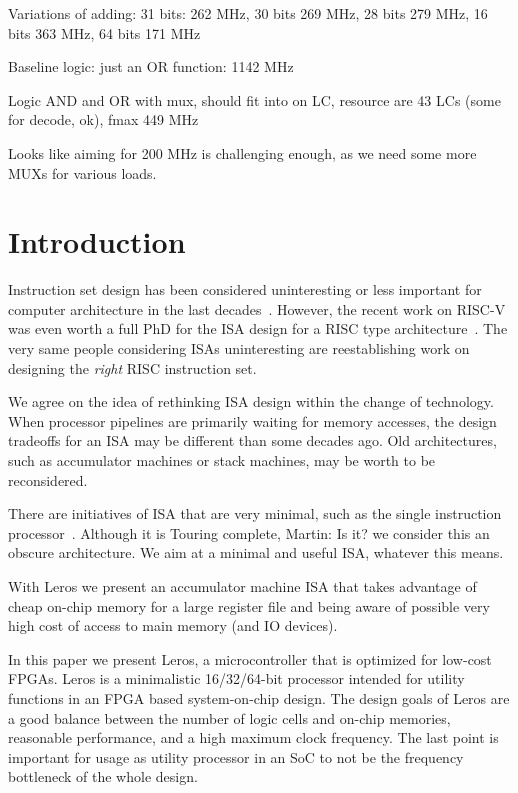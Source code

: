 \documentclass[a4paper,fontsize=10pt,twoside,DIV15,BCOR12mm,headinclude=true,footinclude=false,pagesize,bibtotoc]{scrbook}
\newcommand{\martin}[1]{{\color{blue} Martin: #1}}
\begin{document}
Variations of adding: 31 bits: 262 MHz, 30 bits 269 MHz, 28 bits 279 MHz, 16 bits 363 MHz, 64 bits 171 MHz

Baseline logic: just an OR function: 1142 MHz

Logic AND and OR with mux, should fit into on LC, resource are 43 LCs (some for decode, ok), fmax 449 MHz

Looks like aiming for 200 MHz is challenging enough, as we need some more MUXs
for various loads.



\chapter{Introduction}
\label{sec:intro}

Instruction set design has been considered uninteresting or less important for computer
architecture in the last decades~\cite{the right H and P book, or the slides}.
However, the recent work on RISC-V was even worth a full PhD for the ISA design
for a RISC type architecture~\cite{Andrew thesis}.
The very same people considering ISAs uninteresting are reestablishing work on
designing the \emph{right} RISC instruction set.

We agree on the idea of rethinking ISA design within the change of technology.
When processor pipelines are primarily waiting for memory accesses, the design
tradeoffs for an ISA may be different than some decades ago.
Old architectures, such as accumulator machines or stack machines, may be worth
to be reconsidered.

There are initiatives of ISA that are very minimal, such as the single instruction
processor~\cite{find it}. Although it is Touring complete, \martin{Is it?} we consider this
an obscure architecture.
We aim at a minimal and useful ISA, whatever this means.

With Leros we present an accumulator machine ISA that takes advantage of cheap
on-chip memory for a large register file and being aware of possible very high cost
of access to main memory (and IO devices).


In this paper we present Leros, a microcontroller that is optimized for low-cost FPGAs.
Leros is a minimalistic 16/32/64-bit processor intended for utility functions in an FPGA based
system-on-chip design. The design goals of Leros are a good balance between
the number of logic cells and on-chip memories, reasonable performance, and a high
maximum clock frequency. The last point is important for usage as utility processor
in an SoC to not be the frequency bottleneck of the whole design.
\end{document}
